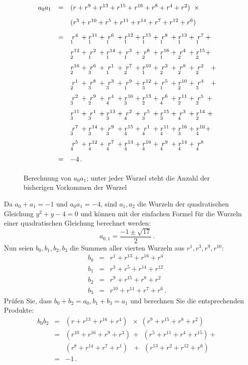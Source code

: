 \begin{figure}[t]
\[
\renewcommand{\arraystretch}{1.8}
\begin{array}{lcl}
a_0a_1&=&(r + r^9 + r^{13} +r^{15} +r^{16} + r^8+r^4+r^2)\;\;\times\\
&&(r^3 + r^{10} + r^{5} +r^{11} +r^{14} + r^7+r^{12}+r^6)\\
&=&\occ{4}{1} + \occ{11}{1} + \occ{6}{1} + \occ{12}{1} + \occ{15}{1} + \occ{8}{1} + \occ{13}{1} + \occ{7}{1} +\\
&&\occ{12}{2} + \occ{2}{1} + \occ{14}{1} + \occ{3}{1} + \occ{6}{2} + \occ{16}{1} + \occ{4}{2} + \occ{15}{2} +\\
&&\occ{16}{2} + \occ{6}{3} + \occ{1}{1} + \occ{7}{2} + \occ{10}{1} + \occ{3}{2} + \occ{8}{2} + \occ{2}{2}\;\;\: +\\
&&\occ{1}{2} + \occ{8}{3} + \occ{3}{3} + \occ{9}{1} + \occ{12}{3} + \occ{5}{1} + \occ{10}{2} + \occ{4}{3}\;\;\: +\\
&&\occ{2}{3} + \occ{9}{2} + \occ{4}{4} + \occ{10}{3} + \occ{13}{2} + \occ{6}{4} + \occ{11}{2} + \occ{5}{2} \:+\\
&&\occ{11}{3} + \occ{1}{3} + \occ{13}{3} + \occ{2}{4} + \occ{5}{3} + \occ{15}{3} + \occ{3}{4} + \occ{14}{2} \;+\\
&&\occ{7}{3} + \occ{14}{3} + \occ{9}{3} + \occ{15}{4} + \occ{1}{4} + \occ{11}{4} + \occ{16}{3} + \occ{10}{4} +\\
&&\occ{5}{4} + \occ{12}{4} + \occ{7}{4} + \occ{13}{4} + \occ{16}{4} + \occ{9}{4} + \occ{14}{4} + \occ{8}{4}\\
&=&-4\,.
\end{array}
\]
\caption{Berechnung von $a_0a_1$; unter jeder Wurzel steht die Anzahl der bisherigen Vorkommen der Wurzel}\label{fig.a0a1}
\end{figure}
Da $a_0+a_1=-1$ und $a_0 a_1=-4$, sind $a_1,a_2$ die Wurzeln der quadratischen Gleichung $y^2+y-4=0$ und können mit der einfachen Formel für die Wurzeln einer quadratischen Gleichung berechnet werden:
\[
a_{0,1} = \frac{-1\pm\sqrt{17}}{2}\,.
\]
Nun seien $b_0,b_1,b_2,b_3$ die Summen aller vierten Wurzeln aus $r^1,r^3,r^9,r^{10}$:
\begin{eqnarray*}
b_0&=& r^1+ r^{13} + r^{16} + r^4\\
b_1&=& r^3+ r^{5} + r^{14} + r^{12}\\
b_2&=& r^9+ r^{15} + r^{8} + r^2\\
b_3&=& r^{10}+ r^{11} + r^{7} + r^6\,.
\end{eqnarray*}
Prüfen Sie, dass $b_0+b_2=a_0, b_1+b_3=a_1$ und berechnen Sie die entsprechenden Produkte:
\begin{eqnarray*}
b_0b_2&=&(r + r^{13} + r^{16} +r^4)\;\;\times\;(r^9 + r^{15} + r^{8} +r^{2})\\
&=&(r^{10}+r^{16}+r^9+r^3)\,+\;\,(r^{5}+r^{11}+r^4+r^{15})+\\
&&(r^{8}+r^{14}+r^7+r^1)\,\;\,+\;\,(r^{13}+r^{2}+r^{12}+r^6)\\
&=&-1\,.
\end{eqnarray*}


